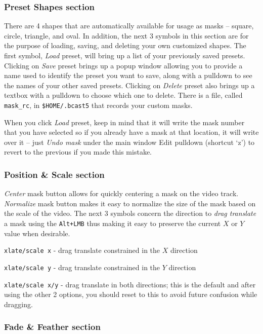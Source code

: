 \subsubsection*{Preset Shapes section}%
\label{ssub:preset_shape_section}

There are 4 shapes that are automatically available for usage as masks – square, circle, triangle, and oval.  In addition, the next 3 symbols in this section are for the purpose of loading, saving, and deleting your own customized shapes.  The first symbol, \textit{Load} preset, will bring up a list of your previously saved presets.  Clicking on \textit{Save} preset brings up a popup window allowing you to provide a name used to identify the preset you want to save, along with a pulldown to see the names of your other saved presets.   Clicking on \textit{Delete} preset also brings up a textbox with a pulldown to choose which one to delete.  There is a file, called \texttt{mask\_rc}, in \texttt{\$HOME/.bcast5} that records your custom masks.  

When you click \textit{Load} preset, keep in mind that it will write the mask number that you have selected so if you already have a mask at that location, it will write over it – just \textit{Undo mask} under the main window Edit pulldown (shortcut `z') to revert to the previous if you made this mistake.

\subsubsection*{Position \& Scale section}%
\label{ssub:position_scale_section}

\textit{Center} mask button allows for quickly centering a mask on the video track. 
\textit{Normalize} mask button makes it easy to normalize the size of the mask based on the scale of the video. 
The next 3 symbols concern the direction to \textit{drag translate} a mask using the \texttt{Alt+LMB} thus making it easy to preserve the current $X$ or $Y$ value when desirable.

\texttt{xlate/scale x}	- drag translate constrained in the $X$ direction

\texttt{xlate/scale y}	- drag translate constrained in the $Y$ direction

\texttt{xlate/scale x/y}	- drag translate in both directions; this is the default and after using the other 2 options, you should reset to this to avoid future confusion while dragging.

\subsubsection*{Fade \& Feather section}%
\label{ssub:fade_feather_section}

